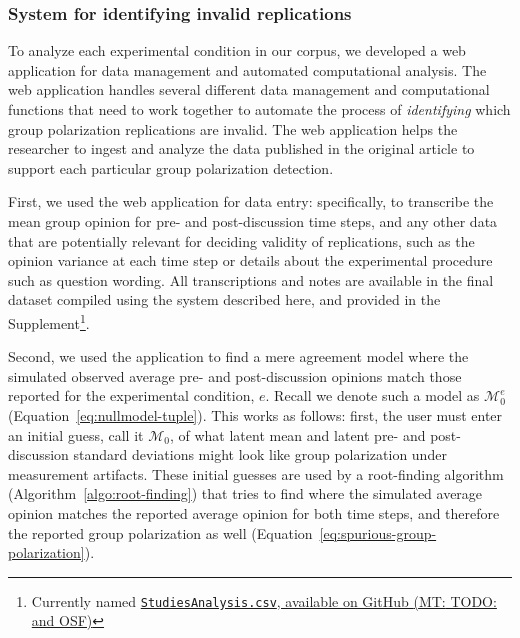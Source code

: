 \documentclass[preview]{article}
\newcommand{\mupre}{\mu_\mathrm{pre}}
\newcommand{\mupost}{\mu_\mathrm{post}}
\newcommand{\nullmodel}{\mathcal{M}_0}
\newcommand{\mt}[1]{{\textcolor{myorange} {({\tiny MT:} #1)}}}
\begin{document}
\subsubsection{System for identifying invalid replications}\label{system-for-identifying-invalid-replications}

%
% 

To analyze each experimental condition in our corpus, we developed a web
application for data management and automated computational analysis. The web
application handles several different data management and computational
functions that need to work together to automate the process of
\emph{identifying} which group polarization replications are invalid.
The web application helps the researcher to ingest and analyze
the data published in the original article to support each particular
group polarization detection. 

First, we used the web application for data entry: specifically, to transcribe
the mean group opinion for pre- and post-discussion time steps, and any other
data that are potentially relevant for deciding validity of replications,
such as the opinion variance at each time step or details about the
experimental procedure such as question wording. All transcriptions and 
notes are available in the final dataset compiled using the system described
here, and provided in the Supplement\footnote{Currently named
\href{https://github.com/mt-digital/gp-statmod/blob/main/data/StudiesAnalysis.csv}{\texttt{StudiesAnalysis.csv}, available on GitHub \mt{TODO: and OSF}}}.

Second, we used the application to find a mere agreement model where the simulated
observed average pre- and post-discussion opinions match those reported for the
experimental condition, $e$. Recall we denote such a model as $\nullmodel^e$
(Equation~\ref{eq:nullmodel-tuple}). This works as follows: first, the user must enter an
initial guess, call it $\nullmodel$, of what latent mean and latent pre- and
post-discussion standard deviations might look like group polarization under measurement
artifacts. These initial guesses are used by a root-finding algorithm
(Algorithm~\ref{algo:root-finding}) that tries to find
where the simulated average opinion matches the reported average opinion for both time
steps, and therefore the reported group polarization as well
(Equation~\ref{eq:spurious-group-polarization}). 
\end{document}
